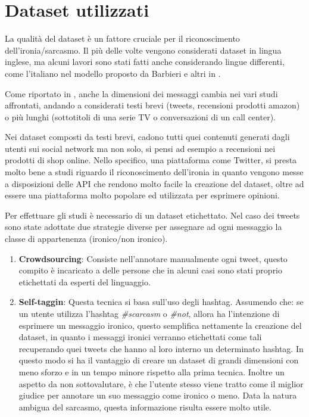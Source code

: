 \documentclass[oneside]{book}
\begin{document}
\section{Dataset utilizzati}
La qualità del dataset è un fattore cruciale per il riconoscimento dell'ironia/sarcasmo. Il più delle volte vengono considerati dataset in lingua inglese, ma alcuni lavori sono stati fatti anche considerando lingue differenti, come l'italiano nel modello proposto da Barbieri e altri in \cite{sarcasm-ita}.

Come riportato in \cite{survey5}, anche la dimensioni dei messaggi cambia nei vari studi affrontati, andando a considerati testi brevi (tweets, recensioni prodotti amazon) o più lunghi (sottotitoli di una serie TV o conversazioni di un call center).

Nei dataset composti da testi brevi, cadono tutti quei contenuti generati dagli utenti sui social network ma non solo, si pensi ad esempio a recensioni nei prodotti di shop online. Nello specifico, una piattaforma come Twitter, si presta molto bene a studi riguardo il riconoscimento dell'ironia in quanto vengono messe a disposizioni delle API che rendono molto facile la creazione del dataset, oltre ad essere una piattaforma molto popolare ed utilizzata per esprimere opinioni.

Per effettuare gli studi è necessario di un dataset etichettato.
Nel caso dei tweets sono state adottate due strategie diverse per assegnare ad ogni messaggio la classe di appartenenza (ironico/non ironico).

\begin{enumerate}
	\item \textbf{Crowdsourcing}: Consiste nell'annotare manualmente ogni tweet, questo compito è incaricato a delle persone che in alcuni casi \cite{crowd} sono stati proprio etichettati da esperti del linguaggio.
	\item \textbf{Self-taggin}: Questa tecnica si basa sull'uso degli hashtag. Assumendo che: se un utente utilizza l'hashtag \textit{\#scarcasm} o \textit{\#not}, allora ha l'intenzione di esprimere un messaggio ironico, questo semplifica nettamente la creazione del dataset, in quanto i messaggi ironici verranno etichettati come tali recuperando quei tweets che hanno al loro interno un determinato hashtag. In questo modo si ha il vantaggio di creare un dataset di grandi dimensioni con meno sforzo e in un tempo minore rispetto alla prima tecnica. Inoltre un aspetto da non sottovalutare, è che l'utente stesso viene tratto come il miglior giudice per annotare un suo messaggio come ironico o meno. Data la natura ambigua del sarcasmo, questa informazione risulta essere molto utile.
\end{enumerate}
\end{document}
